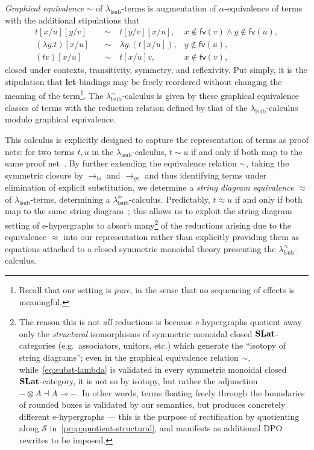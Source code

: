 \emph{Graphical equivalence} $\sim$ of $\lambda_{\text{lsub}}$-terms is augmentation of $\alpha$-equivalence of terms with the additional stipulations that
\begin{align}
	t [x/u] [y/v] \quad        & \sim \quad t [y/v] [x/u],        & x \notin \textsf{fv} (v) \land y \notin \textsf{fv} (u), \nonumber \\
	\label{eq:subst-lambda}
	(\lambda y. t) [x/u] \quad & \sim \quad \lambda y. (t [x/u]), & y \notin \textsf{fv} (u), \tag{$\ast$}                             \\
	(t v) [x/u] \quad          & \sim \quad t [x/u] v,            & x \notin \textsf{fv} (v), \nonumber
\end{align}
closed under contexts, transitivity, symmetry, and reflexivity.
Put simply, it is the stipulation that \textbf{let}-bindings may be freely reordered without changing the meaning of the term\footnote{Recall that our setting is \emph{pure}, in the sense that no sequencing of effects is meaningful.}.
The $\lambda^\sim_{\text{lsub}}$-calculus is given by these graphical equivalence classes of terms with the reduction relation defined by that of the $\lambda_{\text{lsub}}$-calculus modulo graphical equivalence.

This calculus is explicitly designed to capture the representation of terms as proof nets: for two terms $t, u$ in the $\lambda_{\text{lsub}}$-calculus, $t \sim u$ if and only if both map to the same proof net~\cite{accattoliJumpingBoxGraphical2011}.
By further extending the equivalence relation $\sim$, taking the symmetric closure by $\to_{ls}$ and $\to_{gc}$ and thus identifying terms under elimination of explicit substitution, we determine a \emph{string diagram equivalence} $\approx$ of $\lambda_{\text{lsub}}$-terms, determining a $\lambda^\approx_{\text{lsub}}$-calculus.
Predictably, $t \approx u$ if and only if both map to the same string diagram~\cite[§ 5.1.1]{ghica2024stringdiagramslambdacalculifunctional}; this allows us to exploit the string diagram setting of e-hypergraphs to absorb many\footnote{The reason this is not \emph{all} reductions is because e-hypergraphs quotient away only the \emph{structural} isomorphisms of symmetric monoidal closed $\mathbf{SLat}$-categories (e.g.\ associators, unitors, etc.) which generate the \enquote{isotopy of string diagrams}; even in the graphical equivalence relation $\sim$, while~\autoref{eq:subst-lambda} is validated in every symmetric monoidal closed $\mathbf{SLat}$-category, it is not so by isotopy, but rather the adjunction $ - \otimes A \dashv A \multimap -$. In other words, terms floating freely through the boundaries of rounded boxes is validated by our semantics, but produces concretely different e-hypergraphs --- this is the purpose of rectification by quotienting along $\mathcal{S}$ in~\autoref{prop:quotient-structural}, and manifests as additional DPO rewrites to be imposed.} of the reductions arising due to the equivalence $\approx$ into our representation rather than explicitly providing them as equations attached to a closed symmetric monoidal theory presenting the $\lambda^\approx_{\text{lsub}}$-calculus.

